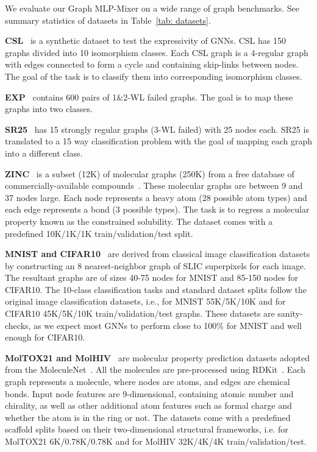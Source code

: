 \documentclass{article}
\begin{document}
We evaluate our Graph MLP-Mixer on a wide range of graph benchmarks. See summary statistics of datasets in Table~\ref{tab: datasets}.


\textbf{CSL}~\citep{murphy2019relational} is a synthetic dataset to test the expressivity of GNNs.  CSL has 150 graphs divided into 10 isomorphism classes. Each CSL graph is a 4-regular graph with edges connected to form a cycle and containing skip-links between nodes.  The goal of the task is to classify them into corresponding isomorphism classes. 

\textbf{EXP}~\citep{EXP} contains 600 pairs of 1\&2-WL failed graphs. The goal is to map these graphs into two classes.

\textbf{SR25}~\citep{balcilar2021breaking} has 15 strongly regular graphs (3-WL failed) with 25 nodes each. SR25 is translated to a 15 way classification problem with the goal of mapping each graph into a different class.


\textbf{ZINC}~\citep{dwivedi2020benchmarking} is a subset (12K) of molecular graphs (250K) from a free database of commercially-available compounds~\citep{ZINC}. These molecular graphs are between 9 and 37 nodes large. Each node represents a heavy atom (28 possible atom types) and each edge represents a bond (3 possible types). The task is to regress a molecular property known as the constrained solubility. The dataset comes with a predefined 10K/1K/1K train/validation/test split.

\textbf{MNIST and CIFAR10}~\citep{dwivedi2020benchmarking} are derived from classical image classification datasets by constructing an 8 nearest-neighbor graph of SLIC superpixels for each image. The resultant graphs are of sizes 40-75 nodes for MNIST and 85-150 nodes for CIFAR10. The 10-class classification tasks and standard dataset splits follow the original image classification datasets, i.e., for MNIST 55K/5K/10K and for CIFAR10 45K/5K/10K train/validation/test graphs.  These datasets are sanity-checks, as we expect most GNNs to perform close to 100\% for MNIST and well enough for CIFAR10.


\textbf{MolTOX21 and MolHIV}~\citep{hu2020open} are molecular property prediction datasets adopted from the MoleculeNet~\citep{MoleculeNet}. All the molecules are pre-processed using RDKit~\citep{landrum2006rdkit}. Each graph represents a molecule, where nodes are atoms, and edges are chemical bonds. Input node features are 9-dimensional, containing atomic number and chirality, as well as other additional atom features such as formal charge and whether the atom is in the ring or not. The datasets come with a predefined scaffold splits based on their two-dimensional structural frameworks, i.e. for MolTOX21 6K/0.78K/0.78K and for MolHIV 32K/4K/4K train/validation/test.
\end{document}
